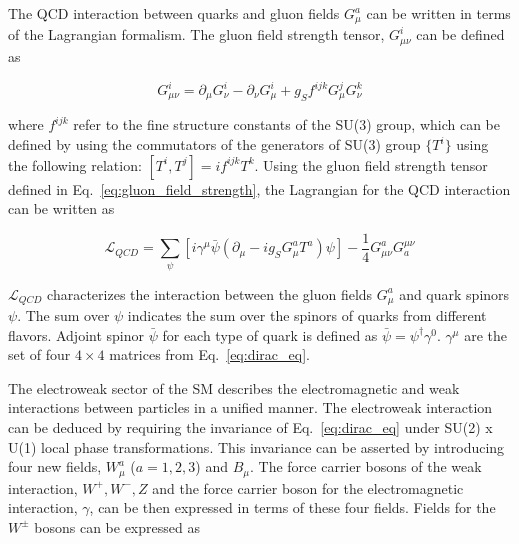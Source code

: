 The QCD interaction between quarks and gluon fields $G_{\mu}^{a}$ can be written in terms of the Lagrangian formalism.
The gluon field strength tensor, $G_{\mu\nu}^i$ can be defined as

\begin{equation}
    G_{\mu\nu}^i = \partial_{\mu}G_{\nu}^i - \partial_{\nu}G_{\mu}^i + g_{S} f^{ijk} G_{\mu}^{j} G_{\nu}^{k}
    \label{eq:gluon_field_strength}
\end{equation}

where $f^{ijk}$ refer to the fine structure constants of the SU(3) group, which can be defined by using the
commutators of the generators of SU(3) group $\{ T^{i} \}$ using the following relation: 
$[ T^{i}, T^{j} ] = i f^{ijk} T^{k}$. 
Using the gluon field strength tensor defined in Eq.~\ref{eq:gluon_field_strength}, 
the Lagrangian for the QCD interaction can be written as


\begin{equation}
    \mathcal{L}_{QCD} = \sum_{\psi} \left[ i \gamma^{\mu} \bar{\psi} \left( \partial_{\mu} - i g_{S} G_{\mu}^{a} T^{a} \right) \psi \right] - \frac{1}{4} G_{\mu\nu}^{a} G^{\mu\nu}_{a}
\end{equation}

$\mathcal{L}_{QCD}$ characterizes the interaction between the gluon fields $G_{\mu}^{a}$ and quark spinors $\psi$.
The sum over $\psi$ indicates the sum over the spinors of quarks from different flavors.
Adjoint spinor $\bar{\psi}$ for each type of quark is defined as $\bar{\psi} = \psi^{\dag} \gamma^0$.
$\gamma^{\mu}$ are the set of four $4 \times 4$ matrices from Eq.~\ref{eq:dirac_eq}. 

The electroweak sector of the SM describes the electromagnetic and weak interactions between particles in a unified manner. The electroweak interaction
can be deduced by requiring the invariance of Eq.~\ref{eq:dirac_eq} under SU(2) x U(1) local phase transformations. 
This invariance can be asserted by introducing four
new fields, $W_{\mu}^{a}$ ($a = 1, 2, 3$) and $B_{\mu}$. The force carrier bosons of the weak interaction, $W^{+}, W^{-}, Z$ and the force carrier boson 
for the electromagnetic interaction, $\gamma$, can be then expressed in terms of these four fields. Fields for the $W^{\pm}$ bosons can be expressed as

